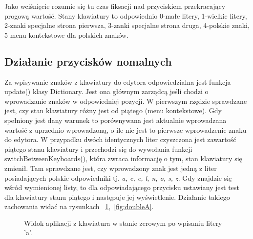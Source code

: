 \documentclass[twoside,a4paper]{book}
\begin{document}
Jako wciśnięcie rozumie się tu czas fiksacji nad przyciskiem przekracający progową wartość. Stany klawiatury to odpowiednio 0-małe litery, 1-wielkie litery, 2-znaki specjalne strona pierwsza, 3-zanki specjalne strona druga, 4-polskie znaki, 5-menu kontekstowe dla polskich znaków.
\subsection{Działanie przycisków nomalnych}
Za wpisywanie znaków z klawiatury do edytora odpowiedzialna jest funkcja update() klasy Dictionary. Jest ona głównym zarządcą jeśli chodzi o wprowadzanie znaków w odpowiedniej pozycji. W pierwszym rzędzie sprawdzane jest, czy stan klawiatury różny jest od piątego (menu kontekstowe). Gdy spełniony jest dany warunek to porównywana jest aktualnie wprowadzana wartość z uprzednio wprowadzoną, o ile nie jest to pierwsze wprowadzenie znaku do edytora. W przypadku dwóch identycznych liter czyszczona jest zawartość piątego stanu klawiatury i przechodzi się do wywołania funkcji switchBetweenKeyboards(), która zwraca informację o tym, stan klawiatury się zmienił. Tam sprawdzane jest, czy wprowadzony znak jest jedną z liter posiadających polskie odpowiedniki tj. \textit{a, c, e, l, n, o, s, z}. Gdy znajdzie się wśród wymienionej listy, to dla odpowiadającego przycisku ustawiany jest test dla klawiatury stanu piątego i następuje jej wyświetlenie. Działanie takiego zachowania widać na rysunkach 
 ~\ref{fig:startA},~\ref{fig:doubleA}.
\begin{figure}[!h]
		\centering
		\caption{Widok aplikacji z klawiatura w stanie zerowym po wpisaniu litery 'a'.}
		\label{fig:startA}
\end{figure}
\end{document}
